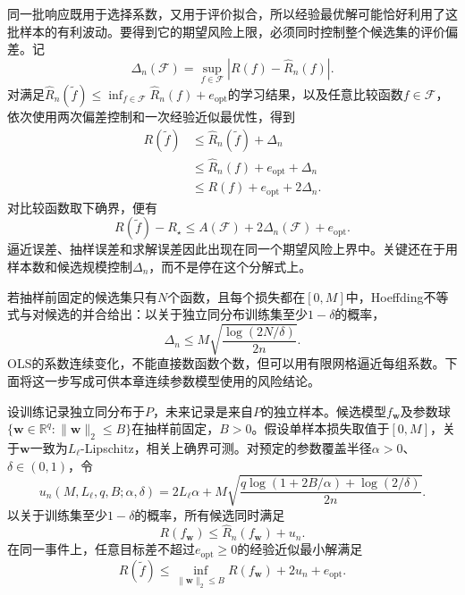 同一批响应既用于选择系数，又用于评价拟合，所以经验最优解可能恰好利用了这批样本的有利波动。要得到它的期望风险上限，必须同时控制整个候选集的评价偏差。记
\[
 \Delta_n(\mathcal F)=\sup_{f\in\mathcal F}|R(f)-\widehat R_n(f)|.
\]
对满足$\widehat R_n(\widetilde f)\leq\inf_{f\in\mathcal F}\widehat R_n(f)+e_{\mathrm{opt}}$的学习结果，以及任意比较函数$f\in\mathcal F$，依次使用两次偏差控制和一次经验近似最优性，得到
\begin{equation}
 \begin{aligned}
 R(\widetilde f)
 &\leq\widehat R_n(\widetilde f)+\Delta_n\\
 &\leq\widehat R_n(f)+e_{\mathrm{opt}}+\Delta_n\\
 &\leq R(f)+e_{\mathrm{opt}}+2\Delta_n.
 \end{aligned}
 \label{eq:regression-risk-transfer}
\end{equation}
对比较函数取下确界，便有
\begin{equation}
 R(\widetilde f)-R_{\star}
 \leq A(\mathcal F)+2\Delta_n(\mathcal F)+e_{\mathrm{opt}}.
 \label{eq:regression-risk-three-errors}
\end{equation}
逼近误差、抽样误差和求解误差因此出现在同一个期望风险上界中。关键还在于用样本数和候选规模控制$\Delta_n$，而不是停在这个分解式上。

若抽样前固定的候选集只有$N$个函数，且每个损失都在$[0,M]$中，Hoeffding不等式与对候选的并合给出：以关于独立同分布训练集至少$1-\delta$的概率，
\begin{equation}
 \Delta_n\leq M\sqrt{\frac{\log(2N/\delta)}{2n}}.
 \label{eq:regression-finite-class-deviation}
\end{equation}
OLS的系数连续变化，不能直接数函数个数，但可以用有限网格逼近每组系数。下面将这一步写成可供本章连续参数模型使用的风险结论。

\begin{theorem}[有界连续参数模型的期望风险]
 \label{thm:regression-parametric-risk}
 设训练记录独立同分布于$P$，未来记录是来自$P$的独立样本。候选模型$f_{\bm w}$及参数球$\{\bm w\in\mathbb R^q:\|\bm w\|_2\leq B\}$在抽样前固定，$B>0$。假设单样本损失取值于$[0,M]$，关于$\bm w$一致为$L_{\ell}$-Lipschitz，相关上确界可测。对预定的参数覆盖半径$\alpha>0$、$\delta\in(0,1)$，令
 \begin{equation}
 u_n(M,L_{\ell},q,B;\alpha,\delta)
 =2L_{\ell}\alpha
  +M\sqrt{\frac{q\log(1+2B/\alpha)+\log(2/\delta)}{2n}}.
 \label{eq:regression-risk-radius}
 \end{equation}
 以关于训练集至少$1-\delta$的概率，所有候选同时满足
 \begin{equation}
  R(f_{\bm w})\leq\widehat R_n(f_{\bm w})+u_n.
  \label{eq:regression-parametric-certificate}
 \end{equation}
 在同一事件上，任意目标差不超过$e_{\mathrm{opt}}\geq0$的经验近似最小解满足
 \begin{equation}
  R(\widetilde f)\leq
  \inf_{\|\bm w\|_2\leq B}R(f_{\bm w})+2u_n+e_{\mathrm{opt}}.
  \label{eq:regression-parametric-risk}
 \end{equation}
\end{theorem}

